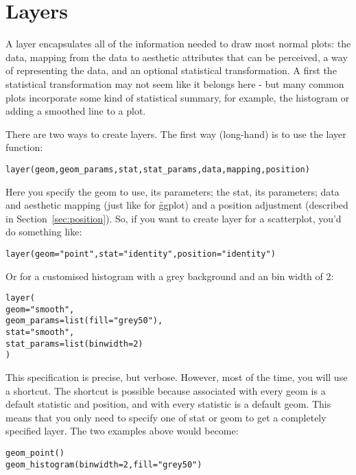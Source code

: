 \section{Layers}
\label{sec:layers}

A layer encapsulates all of the information needed to draw most normal plots:  the data, mapping from the data to aesthetic attributes that can be perceived, a way of representing the data, and an optional statistical transformation.  A first the statistical transformation may not seem like it belongs here - but many common plots incorporate some kind of statistical summary, for example, the histogram or adding a smoothed line to a plot.  

There are two ways to create layers.  The first way (long-hand) is to use the layer function:

\begin{alltt}
  layer(geom, geom_params, stat, stat_params, data, mapping, position)
\end{alltt}

\noindent Here you specify the geom to use, its parameters; the stat, its parameters; data and aesthetic mapping (just like for \f{ggplot}) and a position adjustment (described in Section~\ref{sec:position}).  So, if you want to create layer for a scatterplot, you'd do something like:

\begin{alltt}
layer(geom = "point", stat = "identity", position = "identity")  
\end{alltt}

\noindent Or for a customised histogram with a grey background and an bin width of 2:

\begin{alltt}
layer(
  geom = "smooth", 
  geom_params = list(fill = "grey50"),
  stat = "smooth",
  stat_params = list(binwidth = 2)
)
\end{alltt}

\noindent  This specification is precise, but verbose.  However, most of the time, you will use a shortcut.  The shortcut is possible because associated with every geom is a default statistic and position, and with every statistic is a default geom.  This means that you only need to specify one of stat or geom to get a completely specified layer.  The two examples above would become:

\begin{alltt}
geom_point()
geom_histogram(binwidth = 2, fill = "grey50")
\end{alltt}

